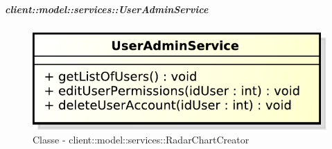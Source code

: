 		\subparagraph{client::model::services::UserAdminService} %
		\label{subp:client_model_services_useradminservice}
		\begin{figure}[htbp]
				\centering
				\centerline{\includegraphics[scale=0.7]{./images/client/classes/model/user_admin_service.pdf}}
				\caption{Classe - client::model::services::RadarChartCreator}
			\end{figure}
